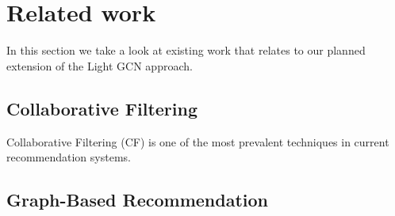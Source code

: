 \section{Related work}
In this section we take a look at existing work that relates to our planned extension of the Light GCN approach.

\subsection{Collaborative Filtering}
Collaborative Filtering (CF) is one of the most prevalent techniques in current recommendation systems\cite{YT_rec,NGCF_2019,Pint_rec}.




\subsection{Graph-Based Recommendation}




